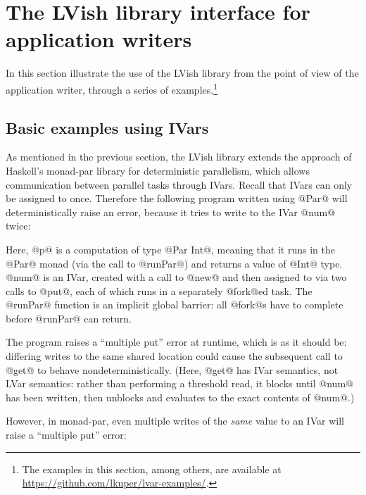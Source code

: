 \section{The LVish library interface for application writers}\label{s:lvish-api}

In this section  illustrate the use of the LVish library from the
point of view of the application writer, through a series of
examples.\footnote{The examples in this section, among others, are
  available at \url{https://github.com/lkuper/lvar-examples/}.  
}

\subsection{Basic examples using IVars}

\ifdefined\DISSERTATION
As mentioned in the previous section, the LVish library extends the
approach of Haskell's monad-par library for deterministic parallelism,
which allows communication between parallel tasks through IVars.
Recall that IVars can only be assigned to once.  Therefore the
following program written using @Par@ will deterministically raise an
error, because it tries to write to the IVar @num@ twice:

\singlespacing

\doublespacing

Here, @p@ is a computation of type @Par Int@, meaning that it runs in
the @Par@ monad (via the call to @runPar@) and returns a value of
@Int@ type.  @num@ is an IVar, created with a call to @new@ and then
assigned to via two calls to @put@, each of which runs in a separately
@fork@ed task.  The @runPar@ function is an implicit global barrier:
all @fork@s have to complete before @runPar@ can return.

The program raises a ``multiple put'' error at runtime, which is as it
should be: differing writes to the same shared location could cause
the subsequent call to @get@ to behave nondeterministically.  (Here,
@get@ has IVar semantics, not LVar semantics: rather than performing a
threshold read, it blocks until @num@ has been written, then unblocks
and evaluates to the exact contents of @num@.)

However, in monad-par, even multiple writes of the \emph{same} value
to an IVar will raise a ``multiple put'' error:

